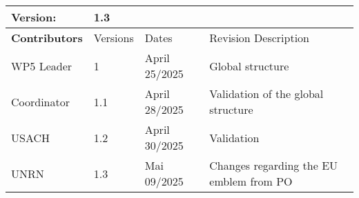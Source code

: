 \begin{tabular}{ >{\raggedright\arraybackslash}p{3cm}| p{2cm} p{3cm} p{7cm} }
    \toprule
    \textbf{Version}: & \multicolumn{3}{l}{1.3} \\ \midrule
    \textbf{Contributors}  & Versions    & Dates       & Revision Description \\ \midrule
    WP5 Leader  & 1    & April 25/2025  & Global structure  \\ 
    Coordinator  & 1.1    & April 28/2025  & Validation of the global structure  \\ 
    USACH  & 1.2   & April 30/2025  & Validation  \\ 
    UNRN  & 1.3   & Mai 09/2025  & Changes regarding the EU emblem from PO   \\ 
    \bottomrule
\end{tabular}  
